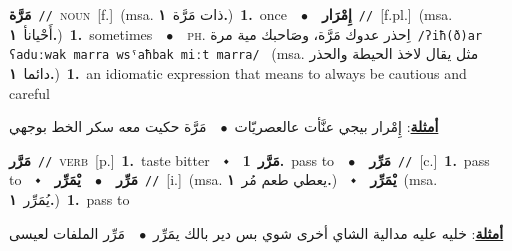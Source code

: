 \documentclass[10pt,a4paper,twoside]{article} %
\begin{document}
\begin{multicols}{2}
{\setlength\topsep{0pt}\textbf{\foreignlanguage{arabic}{مَرَّة}}\ {\color{gray}\texttt{//}\color{black}}\ \textsc{noun}\ [f.]\ \color{gray}(msa. \foreignlanguage{arabic}{ذات مَرَّة}~\foreignlanguage{arabic}{\textbf{١.}})\color{black}\ \textbf{1.}~once\ \ $\bullet$\ \ \setlength\topsep{0pt}\textbf{\foreignlanguage{arabic}{إِمْرَار}}\ {\color{gray}\texttt{//}\color{black}}\ [f.pl.]\ \color{gray}(msa. \foreignlanguage{arabic}{أَحْيانأ}~\foreignlanguage{arabic}{\textbf{١.}})\color{black}\ \textbf{1.}~sometimes\ \ $\bullet$\ \ \textsc{ph.} \color{gray} \foreignlanguage{arabic}{اِحذر عدوك مَرَّة، وصَاحبك مية مرة}\color{black}\ {\color{gray}\texttt{/{\sffamily ʔiħ(ð)ar ʕaduːwak marra wsˤaħbak miːt marra}/}\color{black}}\ \color{gray} (msa. \foreignlanguage{arabic}{مثل يقال لاخذ الحيطة والحذر دائما}~\foreignlanguage{arabic}{\textbf{١.}})\color{black}\ \textbf{1.}~an idiomatic expression that means to always be cautious and careful\  \begin{flushright}\color{gray}\foreignlanguage{arabic}{\textbf{\underline{\foreignlanguage{arabic}{أمثلة}}}: إِمْرار بيجي عنَّأت عالعصريّات\ $\bullet$\ \  مَرَّة حكيت معه سكر الخط بوجهي}\end{flushright}\color{black}} \vspace{2mm}

{\setlength\topsep{0pt}\textbf{\foreignlanguage{arabic}{مَرَّر}}\ {\color{gray}\texttt{//}\color{black}}\ \textsc{verb}\ [p.]\ \textbf{1.}~taste bitter\ \ $\smblkdiamond$\ \ \setlength\topsep{0pt}\textbf{\foreignlanguage{arabic}{مَرَّر}}\ \textbf{1.}~pass to\ \ $\bullet$\ \ \setlength\topsep{0pt}\textbf{\foreignlanguage{arabic}{مَرِّر}}\ {\color{gray}\texttt{//}\color{black}}\ [c.]\ \textbf{1.}~pass to\ \ $\smblkdiamond$\ \ \setlength\topsep{0pt}\textbf{\foreignlanguage{arabic}{مَرِّر}}\ \ $\bullet$\ \ \setlength\topsep{0pt}\textbf{\foreignlanguage{arabic}{يْمَرِّر}}\ {\color{gray}\texttt{//}\color{black}}\ [i.]\ \color{gray}(msa. \foreignlanguage{arabic}{يعطي طعم مُر}~\foreignlanguage{arabic}{\textbf{١.}})\color{black}\ \ $\smblkdiamond$\ \ \setlength\topsep{0pt}\textbf{\foreignlanguage{arabic}{يْمَرِّر}}\ \color{gray}(msa. \foreignlanguage{arabic}{يُمَرِّر}~\foreignlanguage{arabic}{\textbf{١.}})\color{black}\ \textbf{1.}~pass to\  \begin{flushright}\color{gray}\foreignlanguage{arabic}{\textbf{\underline{\foreignlanguage{arabic}{أمثلة}}}: خليه عليه مدالية الشاي أخرى شوي بس دير بالك يمَرِّر\ $\bullet$\ \  مَرِّر الملفات لعيسى}\end{flushright}\color{black}} \vspace{2mm}


\end{multicols}
\end{document}
